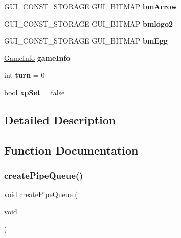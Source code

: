\begin{DoxyCompactItemize}
G\+U\+I\+\_\+\+C\+O\+N\+S\+T\+\_\+\+S\+T\+O\+R\+A\+GE G\+U\+I\+\_\+\+B\+I\+T\+M\+AP {\bfseries bm\+Arrow}
\item 
G\+U\+I\+\_\+\+C\+O\+N\+S\+T\+\_\+\+S\+T\+O\+R\+A\+GE G\+U\+I\+\_\+\+B\+I\+T\+M\+AP {\bfseries bmlogo2}
\item 
\mbox{\label{group___flappy___bird_ga5dda9fe83ba425fc1dfe67e778959b77}} 
G\+U\+I\+\_\+\+C\+O\+N\+S\+T\+\_\+\+S\+T\+O\+R\+A\+GE G\+U\+I\+\_\+\+B\+I\+T\+M\+AP {\bfseries bm\+Egg}
\item 
\mbox{\label{group___flappy___bird_ga4089233ede3ad3ba9618e76697aeda27}} 
\hyperlink{struct_game_info}{Game\+Info} {\bfseries game\+Info}
\item 
\mbox{\label{group___flappy___bird_gaaefa47f4fdf865c2358c22b542a993e4}} 
int {\bfseries turn} = 0
\item 
\mbox{\label{group___flappy___bird_gac641742c262db8ea24d8a4fcfd228e87}} 
bool {\bfseries xp\+Set} = false
\end{DoxyCompactItemize}


\subsection{Detailed Description}


\subsection{Function Documentation}
\mbox{\label{group___flappy___bird_ga94e07f51239dbd78a020cf0cef7ac605}} 
\subsubsection{\texorpdfstring{create\+Pipe\+Queue()}{createPipeQueue()}}
{\footnotesize\ttfamily void create\+Pipe\+Queue (\begin{DoxyParamCaption}\item[{void}]{ }\end{DoxyParamCaption})}



